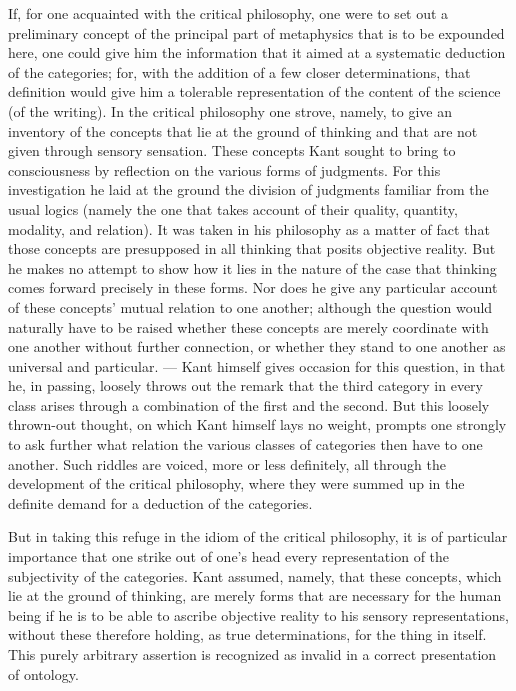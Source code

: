 \documentclass[12pt]{article}
\newcommand{\opage}[1]{\marginnote{\footnotesize\textit{[#1]}}}
\begin{document}
If, for one acquainted with the critical philosophy, one were to set out a
preliminary concept of the principal part of metaphysics that is to be expounded
here, one could give him the information that it aimed at a systematic deduction
of the categories; for, with the addition of a few closer determinations, that
definition would give him a tolerable representation of the content of the science
(of the writing). In the critical philosophy one strove, namely, to give an
inventory of the concepts that lie at the ground of thinking and that are not
given through sensory sensation. These concepts Kant sought to bring to
consciousness by reflection on the various forms of judgments. For this
investigation he laid at the ground the division of judgments familiar from the
usual logics (namely the one that takes account of their quality, quantity,
modality, and relation). It was taken in his philosophy as a matter of fact that
those concepts are presupposed in all thinking that posits objective reality. But
he makes no attempt to show how it lies in the nature of the case that thinking
comes forward precisely in these forms. Nor does he give any particular account
of these concepts' mutual relation to one another; although the question would
naturally have to \opage{192}be raised whether these concepts are merely
coordinate with one another without further connection, or whether they stand to
one another as universal and particular. --- Kant himself gives occasion for this
question, in that he, in passing, loosely throws out the remark that the third
category in every class arises through a combination of the first and the second.
But this loosely thrown-out thought, on which Kant himself lays no weight, prompts
one strongly to ask further what relation the various classes of categories then
have to one another. Such riddles are voiced, more or less definitely, all through
the development of the critical philosophy, where they were summed up in the
definite demand for a deduction of the categories.

But in taking this refuge in the idiom of the critical philosophy, it is of
particular importance that one strike out of one's head every representation of
the subjectivity of the categories. Kant assumed, namely, that these concepts,
which lie at the ground of thinking, are merely forms that are necessary for the
human being if he is to be able to ascribe objective reality to his sensory
representations, without these therefore holding, as true determinations, for the
thing in itself. This purely arbitrary assertion is recognized as invalid in a
correct presentation of ontology.
\end{document}
